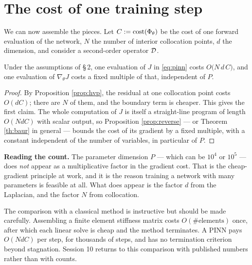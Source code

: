 \documentclass[11pt,a4paper]{article}
\begin{document}
\section{The cost of one training step}

We can now assemble the pieces. Let $C := \operatorname{cost}(\Phi_\theta)$ be the cost of one forward evaluation
of the network, $N$ the number of interior collocation points, $d$ the dimension, and consider a
second-order operator $\mathcal{D}$.

\begin{proposition}\label{prop:cost}
Under the assumptions of §\,2, one evaluation of $J$ in \eqref{eq:pinn} costs
$O\big(N\, d\, C\big)$, and one evaluation of $\nabla_\theta J$ costs a fixed multiple of that,
independent of $P$.
\end{proposition}

\begin{proof}
By Proposition \ref{prop:hvp}, the residual at one collocation point costs $O(dC)$; there are $N$ of
them, and the boundary term is cheaper. This gives the first claim. The whole computation of $J$ is
itself a straight-line program of length $O(NdC)$ with scalar output, so Proposition
\ref{prop:reverse} --- or Theorem \ref{th:baur} in general --- bounds the cost of its gradient by a
fixed multiple, with a constant independent of the number of variables, in particular of $P$.
\end{proof}

\begin{keybox}
\textbf{Reading the count.} The parameter dimension $P$ --- which can be $10^4$ or $10^5$ --- does
\emph{not} appear as a multiplicative factor in the gradient cost. That is the cheap-gradient
principle at work, and it is the reason training a network with many parameters is feasible at all.
What does appear is the factor $d$ from the Laplacian, and the factor $N$ from collocation.

\smallskip
The comparison with a classical method is instructive but should be made carefully. Assembling a
finite element stiffness matrix costs $O(\#\text{elements})$ once, after which each linear solve
is cheap and the method terminates. A PINN pays $O(NdC)$ per step, for thousands of steps, and has
no termination criterion beyond stagnation. Session 10 returns to this comparison with published
numbers rather than with counts.
\end{keybox}

\end{document}
